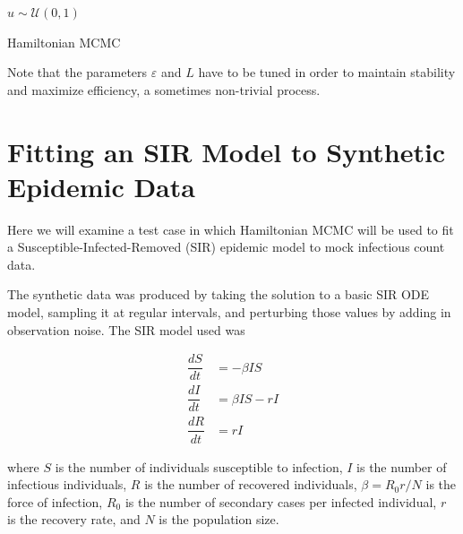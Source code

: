 \documentclass[12pt]{article}
\begin{document}
\begin{algorithm}[H]
{            \BlankLine

            $u \sim \mathcal{U}(0,1)$

            \BlankLine

        }

        \BlankLine


        \BlankLine

        \caption{Hamiltonian MCMC}\label{hmcmc}

    \end{algorithm}

    Note that the parameters $\varepsilon$ and $L$ have to be tuned in order to maintain stability and maximize efficiency, a sometimes non-trivial process.
    
\section{Fitting an SIR Model to Synthetic Epidemic Data}

    Here we will examine a test case in which Hamiltonian MCMC will be used to fit a Susceptible-Infected-Removed (SIR) epidemic model to mock infectious count data.

    The synthetic data was produced by taking the solution to a basic SIR ODE model, sampling it at regular intervals, and perturbing those values by adding in observation noise. The SIR model used was

    \begin{equation}
        \begin{array}{rl}
            \dfrac{dS}{dt} & = - \beta I S \\
            \dfrac{dI}{dt} & = \beta I S - rI  \\
            \dfrac{dR}{dt} & = rI
        \end{array}
    \end{equation}

    where $S$ is the number of individuals susceptible to infection, $I$ is the number of infectious individuals, $R$ is the number of recovered individuals, $\beta = R_0 r / N$ is the force of infection, $R_0$ is the number of secondary cases per infected individual, $r$ is the recovery rate, and $N$ is the population size.
\end{document}
